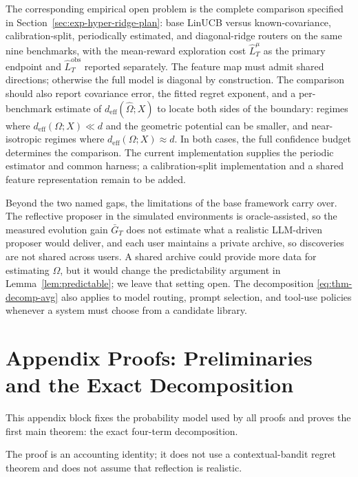 \documentclass{article} %
\begin{document}
The corresponding empirical open problem is the complete comparison specified in Section~\ref{sec:exp-hyper-ridge-plan}: base LinUCB versus known-covariance, calibration-split, periodically estimated, and diagonal-ridge routers on the same nine benchmarks, with the mean-reward exploration cost $\widehat L_T^\mu$ as the primary endpoint and $\widehat L_T^{\mathrm{obs}}$ reported separately. The feature map must admit shared directions; otherwise the full model is diagonal by construction. The comparison should also report covariance error, the fitted regret exponent, and a per-benchmark estimate of $d_{\mathrm{eff}}(\widehat\Omega;X)$ to locate both sides of the boundary: regimes where
$d_{\mathrm{eff}}(\Omega;X)\ll d$ and the geometric potential can be smaller,
and near-isotropic regimes where $d_{\mathrm{eff}}(\Omega;X)\approx d$. In both cases, the full confidence
budget determines the comparison. The current implementation supplies the
periodic estimator and common harness; a calibration-split implementation and
a shared feature representation remain to be added.

Beyond the two named gaps, the limitations of the base framework carry over. The reflective proposer in the simulated environments is oracle-assisted, so the measured evolution gain $\bar G_T$ does not estimate what a realistic LLM-driven proposer would deliver, and each user maintains a private archive, so discoveries are not shared across users. A shared archive could provide more data for estimating \(\Omega\), but it would change the predictability argument in Lemma~\ref{lem:predictable}; we leave that setting open. The decomposition \eqref{eq:thm-decomp-avg} also applies to model routing, prompt selection, and tool-use policies whenever a system must choose from a candidate library.

\appendix

\section{Appendix Proofs: Preliminaries and the Exact Decomposition}

\label{app:proofs}

This appendix block fixes the probability model used by all proofs and proves the first main theorem: the exact four-term decomposition.

The proof is an accounting identity; it does not use a contextual-bandit regret theorem and does not assume that reflection is realistic.
\end{document}
